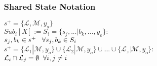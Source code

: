 \documentclass[11pt]{article}
\begin{document}
\subsubsection{Shared State Notation}
\begin{center}
\vspace{1mm}
$
s^+ = \{ \mathcal{L},\mathcal{M},y_o\}
$
\\ \vspace{6mm}
$
Sub_i[X] := S_i = \{s_j,...|b_k,...,y_o\}:
$
\\ \vspace{2mm}
$
s_j,b_k \in s^+ \hspace{3mm} \forall s_j,b_k \in S_i
$
\\ \vspace{6mm}
$
s^+ = \{ \mathcal{L}_1| \mathcal{M},y_o\} \cup \{  \mathcal{L}_2| \mathcal{M},y_o\} \cup ... \cup \{  \mathcal{L}_z| \mathcal{M},y_o\} :
$
\\ \vspace{2mm}
$
\mathcal{L}_i \cap \mathcal{L}_j = \emptyset \hspace{2mm} \forall i,j\neq i
$
\end{center}
\end{document}
